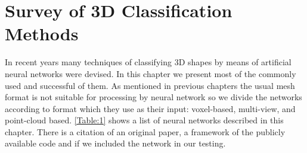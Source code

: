 \chapter{Survey of 3D Classification Methods}
\label{sec:chap3}
In recent years many techniques of classifying 3D shapes by means of artificial neural networks were devised. In this chapter we present most of the commonly used and successful of them. As mentioned in previous chapters the usual mesh format is not suitable for processing by neural network so we divide the networks according to format which they use as their input: voxel-based, multi-view, and point-cloud based. \ref{Table:1} shows a list of neural networks described in this chapter. There is a citation of an original paper, a framework of the publicly available code and if we included the network in our testing.

